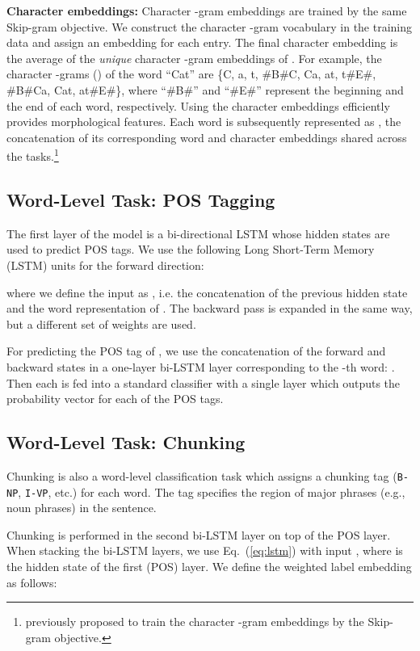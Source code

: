 \documentclass[11pt,a4paper]{article}
\begin{document}
\noindent
{\bf Character embeddings:}
Character -gram embeddings are trained by the same Skip-gram objective.
We construct the character -gram vocabulary in the training data and assign an embedding for each entry.
The final character embedding is the average of the {\it unique} character -gram embeddings of  .
For example, the character -grams () of the word ``Cat'' are \{C, a, t, \#B\#C, Ca, at, t\#E\#, \#B\#Ca, Cat, at\#E\#\}, where ``\#B\#'' and ``\#E\#'' represent the beginning and the end of each word, respectively.
Using the character embeddings efficiently provides morphological features.
Each word is subsequently represented as , the concatenation of its corresponding word and character embeddings shared across the tasks.\footnote{\citet{char2017} previously proposed to train the character -gram embeddings by the Skip-gram objective.}


\subsection{Word-Level Task: POS Tagging}
The first layer of the model is a bi-directional LSTM \citep{graves2005bilstm,hochreiter1997lstm} whose hidden states are used to predict POS tags.
We use the following Long Short-Term Memory (LSTM) units for the forward direction:

where we define the input  as , i.e. the concatenation of the previous hidden state and the word representation of .
The backward pass is expanded in the same way, but a different set of weights are used.

For predicting the POS tag of , we use the concatenation of the forward and backward states in a one-layer bi-LSTM layer corresponding to the -th word: .
Then each   is fed into a standard  classifier with a single  layer which outputs the probability vector  for each of the POS tags.

\subsection{Word-Level Task: Chunking}

Chunking is also a word-level classification task which assigns a chunking tag ({\tt B-NP}, {\tt I-VP}, etc.) for each word. The tag specifies the region of major phrases (e.g., noun phrases) in the sentence.

Chunking is performed in the second bi-LSTM layer on top of the POS layer. 
When stacking the bi-LSTM layers, we use Eq.~(\ref{eq:lstm}) with input , where  is the hidden state of the first (POS) layer.
We define the weighted label embedding  as follows:
\end{document}
